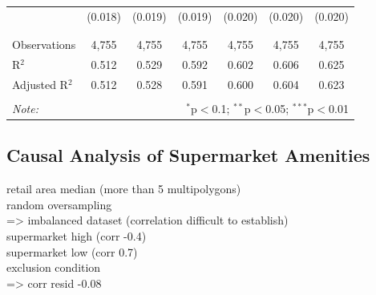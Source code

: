\documentclass{article}
\begin{document}
\begin{table}[H]
\begin{tabular}{@{\extracolsep{-5pt}}lcccccc}
  & (0.018) & (0.019) & (0.019) & (0.020) & (0.020) & (0.020) \\ 
  & & & & & & \\ 
\hline \\[-1.8ex] 
Observations & 4,755 & 4,755 & 4,755 & 4,755 & 4,755 & 4,755 \\ 
R$^{2}$ & 0.512 & 0.529 & 0.592 & 0.602 & 0.606 & 0.625 \\ 
Adjusted R$^{2}$ & 0.512 & 0.528 & 0.591 & 0.600 & 0.604 & 0.623 \\ 
\hline 
\hline \\[-1.8ex] 
\textit{Note:}  & \multicolumn{6}{r}{$^{*}$p$<$0.1; $^{**}$p$<$0.05; $^{***}$p$<$0.01} \\ 
\end{tabular} 
\end{table} 

\subsection{Causal Analysis of Supermarket Amenities}
retail area median (more than 5 multipolygons) \\
random oversampling \\
    => imbalanced dataset (correlation difficult to establish) \\
    
supermarket high (corr -0.4) \\
supermarket low (corr 0.7) \\

exclusion condition \\ 
    => corr resid -0.08 \\
\end{document}
